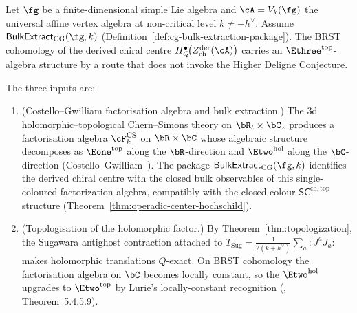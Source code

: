 \begin{proposition}
\label{prop:e3-via-dunn}%
%
%
%
\ClaimStatusConditional
Let $\fg$ be a finite-dimensional simple Lie algebra and
$\cA = V_k(\fg)$ the universal affine vertex algebra at
non-critical level $k \neq -h^\vee$. Assume
$\mathsf{BulkExtract}_{\mathrm{CG}}(\fg,k)$
\textup{(}Definition~\textup{\ref{def:cg-bulk-extraction-package}}\textup{)}.
The BRST cohomology of
the derived chiral centre
$H_Q^\bullet\!\bigl(Z^{\mathrm{der}}_{\mathrm{ch}}(\cA)\bigr)$
carries an $\Ethree^{\mathrm{top}}$-algebra structure by a route
that does not invoke the Higher Deligne Conjecture.

The three inputs are:
\begin{enumerate}[label=\textup{(\roman*)}]
\item \textup{(Costello--Gwilliam factorisation algebra and
bulk extraction.)}
 The $3$d holomorphic--topological Chern--Simons theory on
 $\bR_t \times \bC_z$ produces a factorisation algebra
 $\cF^{\mathrm{CS}}_k$ on $\bR \times \bC$ whose
 algebraic structure decomposes as
 $\Eone^{\mathrm{top}}$ along the $\bR$-direction and
 $\Etwo^{\mathrm{hol}}$ along the $\bC$-direction
 \textup{(}Costello--Gwilliam~\cite{CG17}\textup{)}.
 The package $\mathsf{BulkExtract}_{\mathrm{CG}}(\fg,k)$
 identifies the derived chiral centre with the closed bulk
 observables of this single-coloured factorization algebra,
 compatibly with the closed-colour
 $\mathsf{SC}^{\mathrm{ch,top}}$ structure
 \textup{(}Theorem~\textup{\ref{thm:operadic-center-hochschild}}\textup{)}.

\item \textup{(Topologisation of the holomorphic factor.)}
 By Theorem~\textup{\ref{thm:topologization}}, the Sugawara
 antighost contraction attached to
 $T_{\mathrm{Sug}} = \frac{1}{2(k+h^\vee)}\sum_a {:}J^a J_a{:}$
 makes holomorphic translations $Q$-exact. On BRST cohomology the
 factorisation algebra on $\bC$ becomes locally constant, so the
 $\Etwo^{\mathrm{hol}}$ upgrades to $\Etwo^{\mathrm{top}}$ by
 Lurie's locally-constant recognition
 \textup{(}\cite{HA}, Theorem~5.4.5.9\textup{)}.


\end{enumerate}
\end{proposition}
